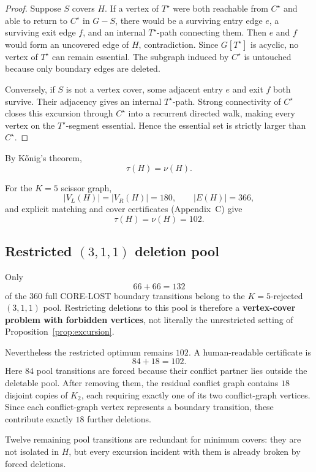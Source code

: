 \documentclass[12pt]{article}
\theoremstyle{definition}
\begin{document}
\begin{proof}
Suppose \(S\) covers \(H\). If a vertex of \(T^\star\) were both reachable from \(C^\star\) and able to return to \(C^\star\) in \(G-S\), there would be a surviving entry edge \(e\), a surviving exit edge \(f\), and an internal \(T^\star\)-path connecting them. Then \(e\) and \(f\) would form an uncovered edge of \(H\), contradiction. Since \(G[T^\star]\) is acyclic, no vertex of \(T^\star\) can remain essential. The subgraph induced by \(C^\star\) is untouched because only boundary edges are deleted.

Conversely, if \(S\) is not a vertex cover, some adjacent entry \(e\) and exit \(f\) both survive. Their adjacency gives an internal \(T^\star\)-path. Strong connectivity of \(C^\star\) closes this excursion through \(C^\star\) into a recurrent directed walk, making every vertex on the \(T^\star\)-segment essential. Hence the essential set is strictly larger than \(C^\star\).
\end{proof}

By K\H{o}nig's theorem,
\[
\tau(H)=\nu(H).
\]

For the \(K=5\) scissor graph,
\[
|V_L(H)|=|V_R(H)|=180,
\qquad
|E(H)|=366,
\]
and explicit matching and cover certificates (Appendix~C) give
\[
\boxed{\tau(H)=\nu(H)=102.}
\]

\subsection*{Restricted \texorpdfstring{\((3,1,1)\)}{(3,1,1)} deletion pool}

Only
\[
66+66=132
\]
of the \(360\) full CORE-LOST boundary transitions belong to the \(K=5\)-rejected \((3,1,1)\) pool. Restricting deletions to this pool is therefore a \textbf{vertex-cover problem with forbidden vertices}, not literally the unrestricted setting of Proposition~\ref{prop:excursion}.

Nevertheless the restricted optimum remains \(102\). A human-readable certificate is
\[
\boxed{84+18=102}.
\]
Here \(84\) pool transitions are forced because their conflict partner lies outside the deletable pool. After removing them, the residual conflict graph contains \(18\) disjoint copies of \(K_2\), each requiring exactly one of its two conflict-graph vertices. Since each conflict-graph vertex represents a boundary transition, these contribute exactly \(18\) further deletions.

Twelve remaining pool transitions are redundant for minimum covers: they are not isolated in \(H\), but every excursion incident with them is already broken by forced deletions.
\end{document}
